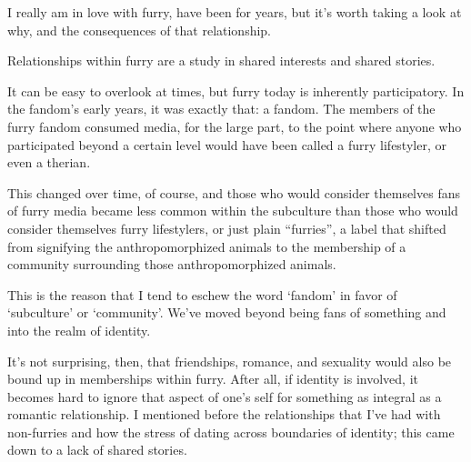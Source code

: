 I really am in love with furry, have been for years, but it's worth taking a look at why, and the consequences of that relationship.

\secdiv

Relationships within furry are a study in shared interests and shared stories.

It can be easy to overlook at times, but furry today is inherently participatory.  In the fandom's early years, it was exactly that: a fandom.  The members of the furry fandom consumed media, for the large part, to the point where anyone who participated beyond a certain level would have been called a furry lifestyler, or even a therian.

This changed over time, of course, and those who would consider themselves fans of furry media became less common within the subculture than those who would consider themselves furry lifestylers, or just plain ``furries'', a label that shifted from signifying the anthropomorphized animals to the membership of a community surrounding those anthropomorphized animals.

This is the reason that I tend to eschew the word `fandom' in favor of `subculture' or `community'.  We've moved beyond being fans of something and into the realm of identity.

It's not surprising, then, that friendships, romance, and sexuality would also be bound up in memberships within furry.  After all, if identity is involved, it becomes hard to ignore that aspect of one's self for something as integral as a romantic relationship.  I mentioned before the relationships that I've had with non-furries and how the stress of dating across boundaries of identity; this came down to a lack of shared stories.


\secdiv

